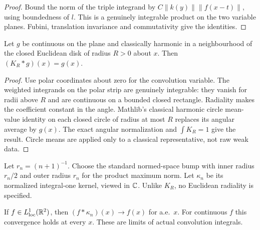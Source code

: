 \begin{proof}
\leanok
Bound the norm of the triple integrand by
$C\lVert k(y)\rVert\lVert f(x-t)\rVert$, using boundedness of $l$.
This is a genuinely integrable product on the two variable planes.
Fubini, translation invariance and commutativity give the identities.
\end{proof}

\begin{lemma}
\label{lem:radial-plane-harmonic-mean}
\leanok
Let $g$ be continuous on the plane and classically harmonic in a neighbourhood
of the closed Euclidean disk of radius $R>0$ about $x$.
Then $(K_R*g)(x)=g(x)$.
\end{lemma}

\begin{proof}
\leanok
Use polar coordinates about zero for the convolution variable.
The weighted integrands on the polar strip are genuinely integrable:
they vanish for radii above $R$ and are continuous on a bounded closed rectangle.
Radiality makes the coefficient constant in the angle.
Mathlib's classical harmonic circle mean-value identity on each closed
circle of radius at most $R$ replaces its angular average by $g(x)$.
The exact angular normalization and $\int K_R=1$ give the result.
Circle means are applied only to a classical representative, not raw weak data.
\end{proof}

\begin{definition}
\label{def:plane-approximate-kernel}
\leanok
Let $r_n=(n+1)^{-1}$. Choose the standard normed-space bump with inner radius
$r_n/2$ and outer radius $r_n$ for the product maximum norm.
Let $\kappa_n$ be its normalized integral-one kernel, viewed in $\mathbb{C}$.
Unlike $K_R$, no Euclidean radiality is specified.
\end{definition}

\begin{lemma}
\label{lem:plane-approximate-identity}
\leanok
If $f\in L^1_{\rm loc}(\mathbb{R}^2)$, then $(f*\kappa_n)(x)\to f(x)$ for a.e.\ $x$.
For continuous $f$ this convergence holds at every $x$.
These are limits of actual convolution integrals.
\end{lemma}

